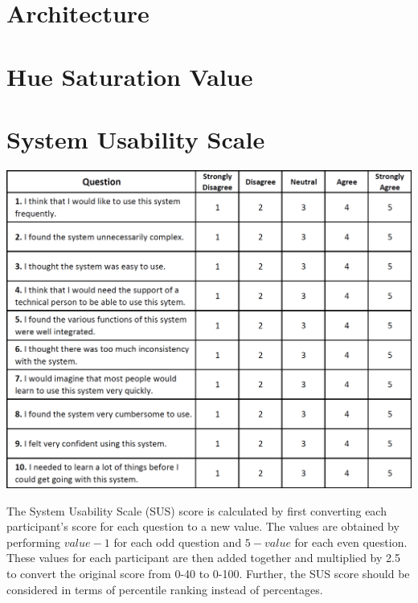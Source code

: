 
\appendix
\chapter{Architecture} {
\label{app:architecture}
	
}

\chapter{Hue Saturation Value} {
\label{app:hsv}
	
}

\chapter{System Usability Scale} {
\label{app:system_usability_scale}

	\includegraphics[width=\textwidth]{images/design/sus}

	The System Usability Scale (SUS) score is calculated by first converting each participant's score for each question to a new value. The values are obtained by performing $value - 1$ for each odd question and $5 - value$ for each even question. These values for each participant are then added together and multiplied by 2.5 to convert the original score from 0-40 to 0-100. Further, the SUS score should be considered in terms of percentile ranking instead of percentages.




}

